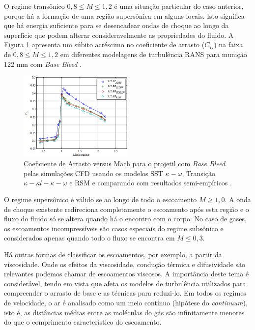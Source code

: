 O regime transônico $0,8 \leq M \leq 1,2$ é uma situação particular do caso anterior, porque há a formação de uma região supersônica em alguns locais. Isto significa que há energia suficiente para se desencadear ondas de choque ao longo da superfície que podem alterar consideravelmente as propriedades do fluido. A Figura \ref{fig:dali2018b} apresenta um súbito acréscimo no coeficiente de arrasto ($C_D$) na faixa de $0,8 \leq M \leq 1,2$ em diferentes modelagens de turbulência RANS para munição 122 mm com \textit{Base Bleed} \cite{Dali2018b}.

\begin{figure}[!ht]
	\centering
    \includegraphics[width=0.5\textwidth]{foto01-dali2018b.png}
	\caption[Coeficiente de Arrasto versus Mach para o projetil com \textit{Base Bleed} pelas simulações CFD usando os modelos SST $\kappa-\omega$, Transição $\kappa-\kappa l-\kappa-\omega$ e RSM e comparando com resultados semi-empíricos \cite{Dali2018b}.]{Coeficiente de Arrasto versus Mach para o projetil com \textit{Base Bleed} pelas simulações CFD usando os modelos SST $\kappa-\omega$, Transição $\kappa-\kappa l-\kappa-\omega$ e RSM e comparando com resultados semi-empíricos \cite{Dali2018b}.}
	\label{fig:dali2018b}
\end{figure}

O regime supersônico é válido se ao longo de todo o escoamento $M \geq 1,0$. A onda de choque existente redireciona completamente o escoamento após esta região e o fluxo do fluido só se altera quando há o encontro com o corpo. No caso de gases, os escoamentos incompressíveis são casos especiais do regime subsônico e considerados apenas quando todo o fluxo se encontra em $M \leq 0,3$.

Há outras formas de classificar os escoamentos, por exemplo, a partir da viscosidade. Onde os efeitos da viscosidade, condução térmica e difusividade são relevantes podemos chamar de escoamentos viscosos. A importância deste tema é considerável, tendo em vista que afeta os modelos de turbulência utilizados para compreender o arrasto de base e as técnicas para reduzi-lo. Em todos os regimes de velocidade, o ar é analisado como um meio contínuo (hipótese do \textit{continuum}), isto é, as distâncias médias entre as moléculas do gás são infinitamente menores do que o comprimento característico do escoamento.

